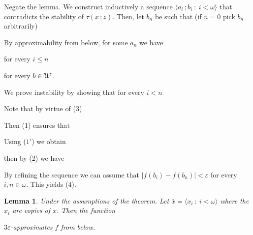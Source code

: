 \documentclass{amsproc}
\makeatletter
\newcounter{thm}
\theoremstyle{mio}
\newtheorem{lemma}[thm]{Lemma}\tcolorboxenvironment{lemma}{mythm}
\providecommand{\proofNameStyle}{\bfseries}
\renewenvironment{proof}[1][\proofname]{\par
  \pushQED{\qed}%
  \normalfont%
  \trivlist
  \item[\hskip\labelsep
        \proofNameStyle
    #1\@addpunct{.}]\ignorespaces
}{%
  \popQED\endtrivlist\@endpefalse
}
\makeatother
\begin{document}
\begin{proof}
  Negate the lemma.
  We construct inductively a sequence $\langle a_i\,;b_i\ :\ i<\omega\rangle$ that contradicts the stability of $\tau(x\,;z)$.
  Then, let $b_n$ be such that (if $n=0$ pick $b_n$ arbitrarily)


  By approximability from below, for some $a_n$ we have

  \hfill for every $i\le n$

  \hfill for every $b\in{\EuScript U}^{z}$.

  We prove instability by showing that for every $i<n$


  Note that by virtue of (3) 


  Then (1) ensures that


  Using ($1'$) we obtain


  then by (2) we have


  By refining the sequence we can assume that $|f(b_i)-f(b_n)|<\varepsilon$ for every $i,n\in\omega$.
  This yields (4).
\end{proof}

\begin{lemma}
  Under the assumptions of the theorem. 
  Let $\bar x=\langle x_i\ :\ i<\omega\rangle$ where the $x_i$ are copies of $x$.
  Then the function\smallskip


  $3\varepsilon$-approximates $f$ from below.
\end{lemma}
\end{document}
